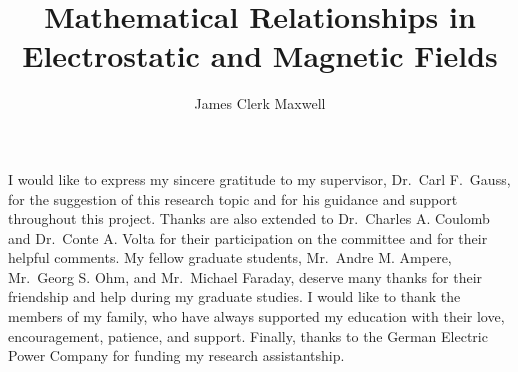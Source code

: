 \title{Mathematical Relationships in Electrostatic and Magnetic Fields}
\author{James Clerk Maxwell}

\fourthmember{}
\fifthmember{}

\maketitle
\makeapproval					%
\makestatement

\begin{acknowledgments}
I would like to express my sincere gratitude to my supervisor,
Dr.\ Carl F.\ Gauss, for the suggestion of this research topic and for his
guidance and support throughout this project.
Thanks are also extended to Dr.\ Charles A. Coulomb and Dr.\ Conte A. Volta
for their participation on the committee and for their helpful comments.
My fellow graduate students, Mr.\ Andre M. Ampere, Mr.\ Georg S. Ohm, and
Mr.\ Michael Faraday, deserve many thanks for their friendship and help during
my graduate studies.
I would like to thank the members of my family, who have always supported my
education with their love, encouragement, patience, and support.
Finally, thanks to the German Electric Power Company for funding my research
assistantship.
\end{acknowledgments}


\tableofcontents
\listoffigures
\newpage
\listoftables
\newpage
\begin{abstract}  \end{abstract}	%
